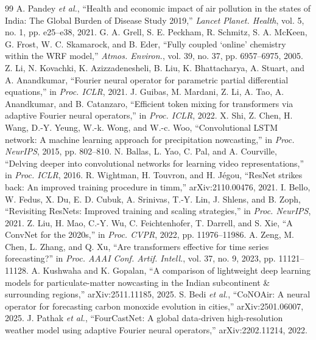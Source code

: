 \documentclass[journal]{IEEEtran}
\begin{document}
\FloatBarrier
\balance
\begin{thebibliography}{99}
 A. Pandey \emph{et al.}, ``Health and economic impact of air pollution in the states of India: The Global Burden of Disease Study 2019,'' \emph{Lancet Planet. Health}, vol. 5, no. 1, pp. e25--e38, 2021.
 G. A. Grell, S. E. Peckham, R. Schmitz, S. A. McKeen, G. Frost, W. C. Skamarock, and B. Eder, ``Fully coupled `online' chemistry within the WRF model,'' \emph{Atmos. Environ.}, vol. 39, no. 37, pp. 6957--6975, 2005.
 Z. Li, N. Kovachki, K. Azizzadenesheli, B. Liu, K. Bhattacharya, A. Stuart, and A. Anandkumar, ``Fourier neural operator for parametric partial differential equations,'' in \emph{Proc. ICLR}, 2021.
 J. Guibas, M. Mardani, Z. Li, A. Tao, A. Anandkumar, and B. Catanzaro, ``Efficient token mixing for transformers via adaptive Fourier neural operators,'' in \emph{Proc. ICLR}, 2022.
 X. Shi, Z. Chen, H. Wang, D.-Y. Yeung, W.-k. Wong, and W.-c. Woo, ``Convolutional LSTM network: A machine learning approach for precipitation nowcasting,'' in \emph{Proc. NeurIPS}, 2015, pp. 802--810.
 N. Ballas, L. Yao, C. Pal, and A. Courville, ``Delving deeper into convolutional networks for learning video representations,'' in \emph{Proc. ICLR}, 2016.
 R. Wightman, H. Touvron, and H. J\'{e}gou, ``ResNet strikes back: An improved training procedure in timm,'' arXiv:2110.00476, 2021.
 I. Bello, W. Fedus, X. Du, E. D. Cubuk, A. Srinivas, T.-Y. Lin, J. Shlens, and B. Zoph, ``Revisiting ResNets: Improved training and scaling strategies,'' in \emph{Proc. NeurIPS}, 2021.
 Z. Liu, H. Mao, C.-Y. Wu, C. Feichtenhofer, T. Darrell, and S. Xie, ``A ConvNet for the 2020s,'' in \emph{Proc. CVPR}, 2022, pp. 11976--11986.
 A. Zeng, M. Chen, L. Zhang, and Q. Xu, ``Are transformers effective for time series forecasting?'' in \emph{Proc. AAAI Conf. Artif. Intell.}, vol. 37, no. 9, 2023, pp. 11121--11128.
 A. Kushwaha and K. Gopalan, ``A comparison of lightweight deep learning models for particulate-matter nowcasting in the Indian subcontinent \& surrounding regions,'' arXiv:2511.11185, 2025.
 S. Bedi \emph{et al.}, ``CoNOAir: A neural operator for forecasting carbon monoxide evolution in cities,'' arXiv:2501.06007, 2025.
 J. Pathak \emph{et al.}, ``FourCastNet: A global data-driven high-resolution weather model using adaptive Fourier neural operators,'' arXiv:2202.11214, 2022.

\end{thebibliography}
\end{document}
